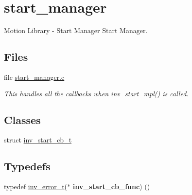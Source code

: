\hypertarget{group___start___manager}{}\section{start\+\_\+manager}
\label{group___start___manager}


Motion Library -\/ Start Manager Start Manager.  


\subsection*{Files}
\begin{DoxyCompactItemize}
\item 
file \hyperlink{start__manager_8c}{start\+\_\+manager.\+c}
\begin{DoxyCompactList}\small\item\em This handles all the callbacks when \hyperlink{group___m_p_l_ga0f2aa09b1e0db8f568bbfd94028fb246}{inv\+\_\+start\+\_\+mpl()} is called. \end{DoxyCompactList}\end{DoxyCompactItemize}
\subsection*{Classes}
\begin{DoxyCompactItemize}
\item 
struct \hyperlink{structinv__start__cb__t}{inv\+\_\+start\+\_\+cb\+\_\+t}
\end{DoxyCompactItemize}
\subsection*{Typedefs}
\begin{DoxyCompactItemize}
\item 
\hypertarget{group___start___manager_ga2694369575038a51c80d63f0ea1e2d7c}{}typedef \hyperlink{structinv__error__t}{inv\+\_\+error\+\_\+t}($\ast$ {\bfseries inv\+\_\+start\+\_\+cb\+\_\+func}) ()\label{group___start___manager_ga2694369575038a51c80d63f0ea1e2d7c}

\end{DoxyCompactItemize}
